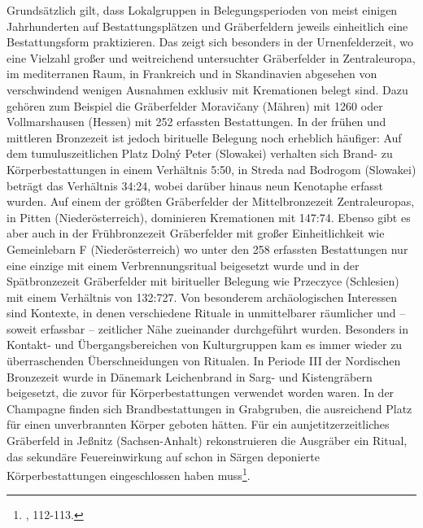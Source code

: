 \documentclass[openany,twoside,twocolumn]{book}
\let\rmarkdownfootnote\footnote%
\def\footnote{\protect\rmarkdownfootnote}
\begin{document}
Grundsätzlich gilt, dass Lokalgruppen in Belegungsperioden von meist einigen Jahrhunderten auf Bestattungsplätzen und Gräberfeldern jeweils einheitlich eine Bestattungsform praktizieren. Das zeigt sich besonders in der Urnenfelderzeit, wo eine Vielzahl großer und weitreichend untersuchter Gräberfelder in Zentraleuropa, im mediterranen Raum, in Frankreich und in Skandinavien abgesehen von verschwindend wenigen Ausnahmen exklusiv mit Kremationen belegt sind. Dazu gehören zum Beispiel die Gräberfelder Moravičany (Mähren) mit 1260 oder Vollmarshausen (Hessen) mit 252 erfassten Bestattungen. In der frühen und mittleren Bronzezeit ist jedoch birituelle Belegung noch erheblich häufiger: Auf dem tumuluszeitlichen Platz Dolný Peter (Slowakei) verhalten sich Brand- zu Körperbestattungen in einem Verhältnis 5:50, in Streda nad Bodrogom (Slowakei) beträgt das Verhältnis 34:24, wobei darüber hinaus neun Kenotaphe erfasst wurden. Auf einem der größten Gräberfelder der Mittelbronzezeit Zentraleuropas, in Pitten (Niederösterreich), dominieren Kremationen mit 147:74. Ebenso gibt es aber auch in der Frühbronzezeit Gräberfelder mit großer Einheitlichkeit wie Gemeinlebarn F (Niederösterreich) wo unter den 258 erfassten Bestattungen nur eine einzige mit einem Verbrennungsritual beigesetzt wurde und in der Spätbronzezeit Gräberfelder mit biritueller Belegung wie Przeczyce (Schlesien) mit einem Verhältnis von 132:727. Von besonderem archäologischen Interessen sind Kontexte, in denen verschiedene Rituale in unmittelbarer räumlicher und -- soweit erfassbar -- zeitlicher Nähe zueinander durchgeführt wurden. Besonders in Kontakt- und Übergangsbereichen von Kulturgruppen kam es immer wieder zu überraschenden Überschneidungen von Ritualen. In Periode III der Nordischen Bronzezeit wurde in Dänemark Leichenbrand in Sarg- und Kistengräbern beigesetzt, die zuvor für Körperbestattungen verwendet worden waren. In der Champagne finden sich Brandbestattungen in Grabgruben, die ausreichend Platz für einen unverbrannten Körper geboten hätten. Für ein aunjetitzerzeitliches Gräberfeld in Jeßnitz (Sachsen-Anhalt) rekonstruieren die Ausgräber ein Ritual, das sekundäre Feuereinwirkung auf schon in Särgen deponierte Körperbestattungen eingeschlossen haben muss\footnote{\textcite{harding_european_2000}, 112-113.}.
\end{document}
